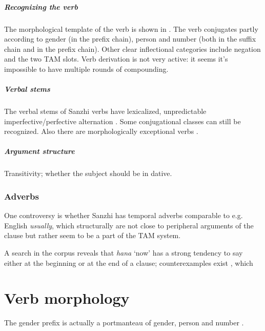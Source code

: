 \documentclass[a4paper, oneside, 12pt]{report}
\newcommand*{\citesec}[1]{\S~{#1}}
\newcommand*{\citetable}[1]{Table~{#1}}
\newcommand*{\citepage}[1]{p.~{#1}}
\newcommand{\form}[1]{\emph{#1}}
\newcommand{\translate}[1]{`#1'}
\begin{document}
\paragraph*{Recognizing the verb}\label{sec:grammatical.pos.verb.recognize}
The morphological template of the verb
is shown in \citet[\citetable{11.9}]{forker2020grammar}.
The verb conjugates partly according to
gender (in the prefix chain), person and number 
(both in the suffix chain and in the prefix chain). 
Other clear inflectional categories include 
negation and the two TAM slots.
Verb derivation is not very active:
it seems it's impossible to have multiple rounds of compounding.

\paragraph*{Verbal stems} The verbal stems of Sanzhi verbs have 
lexicalized, unpredictable imperfective/perfective alternation
\citep[\citesec{11.2}]{forker2020grammar}.
Some conjugational classes can still be recognized.
Also there are morphologically exceptional verbs 
\citep[\citesec{11.2.7}]{forker2020grammar}.

\paragraph*{Argument structure} Transitivity; whether the subject should be in dative.

\subsection{Adverbs}

One controversy is whether Sanzhi has temporal adverbs 
comparable to e.g. English \form{usually}, 
which structurally are not close to peripheral arguments of the clause 
but rather seem to be a part of the TAM system.

A search in the corpus reveals that 
\form{hana} \translate{now} has a strong tendency to say either 
at the beginning or at the end of a clause; 
counterexamples exist 
\citep[\citepage{292}, 37, 40]{forker2020grammar}, 
which 

\chapter{Verb morphology}

The gender prefix is actually a portmanteau of 
gender, person and number \citep[\citetable{20.1}]{forker2020grammar}.
\end{document}
